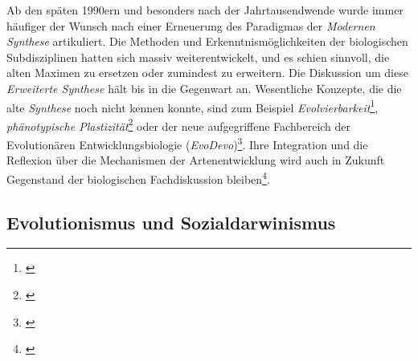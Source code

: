 \documentclass[openany,twoside,twocolumn]{book}
\let\rmarkdownfootnote\footnote%
\def\footnote{\protect\rmarkdownfootnote}
\begin{document}
Ab den späten 1990ern und besonders nach der Jahrtausendwende wurde
immer häufiger der Wunsch nach einer Erneuerung des Paradigmas der
\emph{Modernen Synthese} artikuliert. Die Methoden und
Erkenntnismöglichkeiten der biologischen Subdisziplinen hatten sich
massiv weiterentwickelt, und es schien sinnvoll, die alten Maximen zu
ersetzen oder zumindest zu erweitern. Die Diskussion um diese
\emph{Erweiterte Synthese} hält bis in die Gegenwart an. Wesentliche
Konzepte, die die alte \emph{Synthese} noch nicht kennen konnte, sind
zum Beispiel \emph{Evolvierbarkeit}\footnote{\textcite{wagner_robustness_2013}},
\emph{phänotypische Plastizität}\footnote{\textcite{pigliucci_phenotypic_2001}}
oder der neue aufgegriffene Fachbereich der Evolutionären
Entwicklungsbiologie (\emph{EvoDevo})\footnote{\textcite{muller_evodevo_2007}}.
Ihre Integration und die Reflexion über die Mechanismen der
Artenentwicklung wird auch in Zukunft Gegenstand der biologischen
Fachdiskussion bleiben\footnote{\textcite{pigliucci_elements_2010}}.

\hypertarget{evolutionismus-und-sozialdarwinismus}{%
\subsection{Evolutionismus und
Sozialdarwinismus}\label{evolutionismus-und-sozialdarwinismus}}
\end{document}
